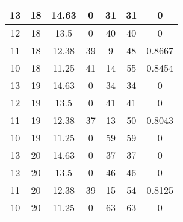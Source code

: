 \documentclass[letterpaper, 12pt]{article}
\begin{document}
\begin{longtable}{|c|c|c|c|c|c|c|}
\hline
13 & 18 & 14.63 & 0 & 31 & 31 & 0 \\
\hline
12 & 18 & 13.5 & 0 & 40 & 40 & 0 \\
\hline
11 & 18 & 12.38 & 39 & 9 & 48 & 0.8667 \\
\hline
10 & 18 & 11.25 & 41 & 14 & 55 & 0.8454 \\
\hline
13 & 19 & 14.63 & 0 & 34 & 34 & 0 \\
\hline
12 & 19 & 13.5 & 0 & 41 & 41 & 0 \\
\hline
11 & 19 & 12.38 & 37 & 13 & 50 & 0.8043 \\
\hline
10 & 19 & 11.25 & 0 & 59 & 59 & 0 \\
\hline
13 & 20 & 14.63 & 0 & 37 & 37 & 0 \\
\hline
12 & 20 & 13.5 & 0 & 46 & 46 & 0 \\
\hline
11 & 20 & 12.38 & 39 & 15 & 54 & 0.8125 \\
\hline
10 & 20 & 11.25 & 0 & 63 & 63 & 0 \\
\hline
\end{longtable}
\end{document}
